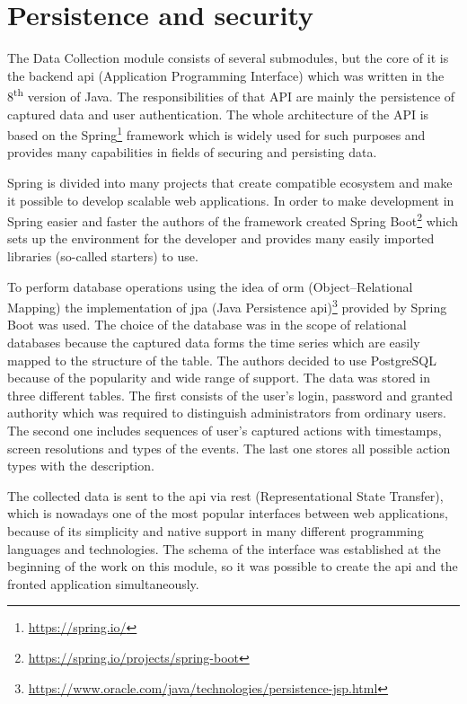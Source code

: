 \section{Persistence and security}\label{sec:persistence-and-security}
The Data Collection module consists of several submodules, but the core of it is the backend \gls{api} (Application Programming Interface) which was written in the 8\textsuperscript{th} version of Java.
The responsibilities of that API are mainly the persistence of captured data and user authentication.
The whole architecture of the API is based on the Spring\footnote{\url{https://spring.io/}} framework which is widely used for such purposes and provides many capabilities in fields of securing and persisting data.

Spring is divided into many projects that create compatible ecosystem and make it possible to develop scalable web applications.
In order to make development in Spring easier and faster the authors of the framework created Spring Boot\footnote{\url{https://spring.io/projects/spring-boot}} which sets up the environment for the developer and provides many easily imported libraries (so-called starters) to use.

To perform database operations using the idea of \gls{orm} (Object–Relational Mapping) the implementation of \gls{jpa} (Java Persistence \gls{api})\footnote{\url{https://www.oracle.com/java/technologies/persistence-jsp.html}} provided by Spring Boot was used.
The choice of the database was in the scope of relational databases because the captured data forms the time series which are easily mapped to the structure of the table.
The authors decided to use PostgreSQL because of the popularity and wide range of support.
The data was stored in three different tables.
The first consists of the user's login, password and granted authority which was required to distinguish administrators from ordinary users.
The second one includes sequences of user's captured actions with timestamps, screen resolutions and types of the events.
The last one stores all possible action types with the description.

The collected data is sent to the \gls{api} via \gls{rest} (Representational State Transfer), which is nowadays one of the most popular interfaces between web applications, because of its simplicity and native support in many different programming languages and technologies.
The schema of the interface was established at the beginning of the work on this module, so it was possible to create the \gls{api} and the fronted application simultaneously.

